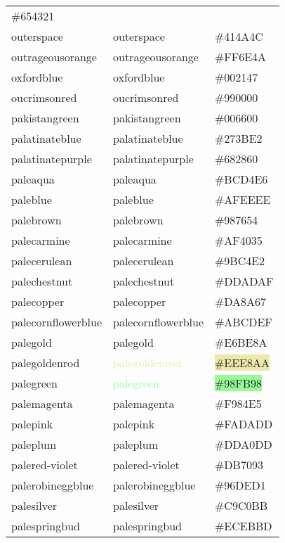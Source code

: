 \documentclass[
]{article}
\begin{document}
\begin{longtable}[]{@{}lll@{}}
\colorbox{darkbrown}{\#654321}\tabularnewline
outerspace & \textcolor{outerspace}{outerspace} &
\colorbox{outerspace}{\#414A4C}\tabularnewline
outrageousorange & \textcolor{outrageousorange}{outrageousorange} &
\colorbox{outrageousorange}{\#FF6E4A}\tabularnewline
oxfordblue & \textcolor{oxfordblue}{oxfordblue} &
\colorbox{oxfordblue}{\#002147}\tabularnewline
oucrimsonred & \textcolor{oucrimsonred}{oucrimsonred} &
\colorbox{oucrimsonred}{\#990000}\tabularnewline
pakistangreen & \textcolor{pakistangreen}{pakistangreen} &
\colorbox{pakistangreen}{\#006600}\tabularnewline
palatinateblue & \textcolor{palatinateblue}{palatinateblue} &
\colorbox{palatinateblue}{\#273BE2}\tabularnewline
palatinatepurple & \textcolor{palatinatepurple}{palatinatepurple} &
\colorbox{palatinatepurple}{\#682860}\tabularnewline
paleaqua & \textcolor{paleaqua}{paleaqua} &
\colorbox{beaublue}{\#BCD4E6}\tabularnewline
paleblue & \textcolor{paleblue}{paleblue} &
\colorbox{paleblue}{\#AFEEEE}\tabularnewline
palebrown & \textcolor{palebrown}{palebrown} &
\colorbox{palebrown}{\#987654}\tabularnewline
palecarmine & \textcolor{palecarmine}{palecarmine} &
\colorbox{mediumcarmine}{\#AF4035}\tabularnewline
palecerulean & \textcolor{palecerulean}{palecerulean} &
\colorbox{palecerulean}{\#9BC4E2}\tabularnewline
palechestnut & \textcolor{palechestnut}{palechestnut} &
\colorbox{palechestnut}{\#DDADAF}\tabularnewline
palecopper & \textcolor{palecopper}{palecopper} &
\colorbox{palecopper}{\#DA8A67}\tabularnewline
palecornflowerblue & \textcolor{palecornflowerblue}{palecornflowerblue}
& \colorbox{palecornflowerblue}{\#ABCDEF}\tabularnewline
palegold & \textcolor{palegold}{palegold} &
\colorbox{palegold}{\#E6BE8A}\tabularnewline
palegoldenrod & \textcolor{palegoldenrod}{palegoldenrod} &
\colorbox{palegoldenrod}{\#EEE8AA}\tabularnewline
palegreen & \textcolor{palegreen}{palegreen} &
\colorbox{palegreen}{\#98FB98}\tabularnewline
palemagenta & \textcolor{palemagenta}{palemagenta} &
\colorbox{palemagenta}{\#F984E5}\tabularnewline
palepink & \textcolor{palepink}{palepink} &
\colorbox{palepink}{\#FADADD}\tabularnewline
paleplum & \textcolor{paleplum}{paleplum} &
\colorbox{mediumlavendermagenta}{\#DDA0DD}\tabularnewline
palered-violet & \textcolor{palered-violet}{palered-violet} &
\colorbox{palered-violet}{\#DB7093}\tabularnewline
palerobineggblue & \textcolor{palerobineggblue}{palerobineggblue} &
\colorbox{palerobineggblue}{\#96DED1}\tabularnewline
palesilver & \textcolor{palesilver}{palesilver} &
\colorbox{palesilver}{\#C9C0BB}\tabularnewline
palespringbud & \textcolor{palespringbud}{palespringbud} &
\colorbox{palespringbud}{\#ECEBBD}\tabularnewline

\end{longtable}
\end{document}
